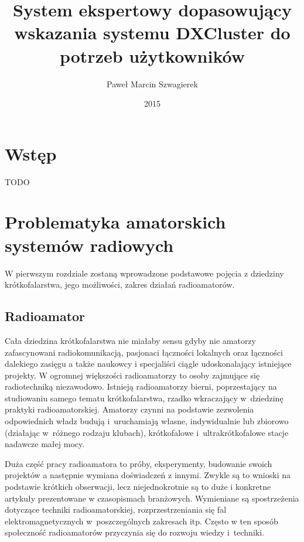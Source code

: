 \documentclass[]{mgr}
\title{System ekspertowy dopasowujący wskazania systemu DXCluster do potrzeb użytkowników}
\author{Paweł Marcin Szwagierek}
\date{2015}
\begin{document}
    
    \maketitle

    \tableofcontents

    \chapter{Wstęp}
    TODO

    \chapter{Problematyka amatorskich systemów radiowych}
    \label{sec:teoretical_description}
    W pierwszym rozdziale zostaną wprowadzone podstawowe pojęcia z dziedziny krótkofalarstwa, jego możliwości, zakres działań radioamatorów.

        \section{Radioamator}
        Cała dziedzina krótkofalarstwa nie miałaby sensu gdyby nie amatorzy zafascynowani radiokomunikacją, pasjonaci łączności lokalnych oraz łączności dalekiego zasięgu a także naukowcy i specjaliści ciągle udoskonalający istniejące projekty. W ogromnej większości radioamatorzy to osoby zajmujące się radiotechniką niezawodowo. Istnieją radioamatorzy bierni, poprzestający na studiowaniu samego tematu krótkofalarstwa, rzadko wkraczający w~dziedzinę praktyki radioamatorskiej. Amatorzy czynni na podstawie zezwolenia odpowiednich władz budują i~uruchamiają własne, indywidualnie lub zbiorowo (działając w~różnego rodzaju klubach), krótkofalowe i~ultrakrótkofalowe stacje nadawcze małej mocy.

        Duża część pracy radioamatora to próby, eksperymenty, budowanie swoich projektów a następnie wymiana doświadczeń z innymi. Zwykle są to wnioski na podstawie krótkich obserwacji, lecz niejednokrotnie są to duże i konkretne artykuły prezentowane w czasopismach branżowych. Wymieniane są spostrzeżenia dotyczące techniki radioamatorskiej, rozprzestrzeniania się fal elektromagnetycznych w~poszczególnych zakresach itp. Często w ten sposób społeczność radioamatorów przyczynia się do rozwoju wiedzy i~techniki. 
\end{document}
